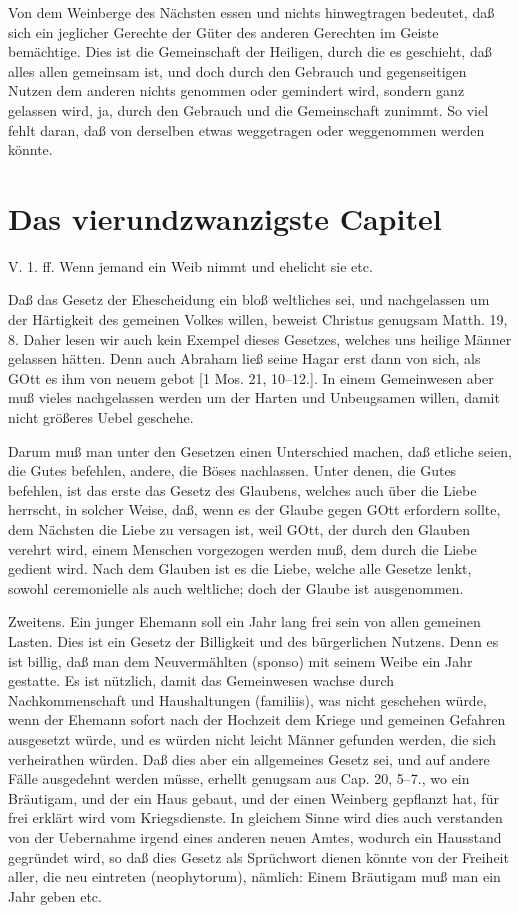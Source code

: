 Von dem Weinberge des Nächsten essen und nichts hinwegtragen bedeutet, daß sich ein jeglicher Gerechte der Güter des anderen Gerechten im Geiste bemächtige. Dies ist die Gemeinschaft der Heiligen, durch die es geschieht, daß alles allen gemeinsam ist, und doch durch den Gebrauch und gegenseitigen Nutzen dem anderen nichts genommen oder gemindert wird, sondern ganz gelassen wird, ja, durch den Gebrauch und die Gemeinschaft zunimmt. So viel fehlt daran, daß von derselben etwas weggetragen oder weggenommen werden könnte.

\section{Das vierundzwanzigste Capitel}

\begin{schriftzitat}
V. 1. ff. Wenn jemand ein Weib nimmt und ehelicht sie etc.
\end{schriftzitat}

Daß das Gesetz der Ehescheidung ein bloß weltliches sei, und nachgelassen um der Härtigkeit des gemeinen Volkes willen, beweist Christus genugsam Matth. 19, 8. Daher lesen wir auch kein Exempel dieses Gesetzes, welches uns heilige Männer gelassen hätten. Denn auch Abraham ließ seine Hagar erst dann von sich, als GOtt es ihm von neuem gebot [1 Mos. 21, 10–12.]. In einem Gemeinwesen aber muß vieles nachgelassen werden um der Harten und Unbeugsamen willen, damit nicht größeres Uebel geschehe.

Darum muß man unter den Gesetzen einen Unterschied machen, daß etliche seien, die Gutes befehlen, andere, die Böses nachlassen. Unter denen, die Gutes befehlen, ist das erste das Gesetz des Glaubens, welches auch über die Liebe herrscht, in solcher Weise, daß, wenn es der Glaube gegen GOtt erfordern sollte, dem Nächsten die Liebe zu versagen ist, weil GOtt, der durch den Glauben verehrt wird, einem Menschen vorgezogen werden muß, dem durch die Liebe gedient wird. Nach dem Glauben ist es die Liebe, welche alle Gesetze lenkt, sowohl ceremonielle als auch weltliche; doch der Glaube ist ausgenommen.

Zweitens. Ein junger Ehemann soll ein Jahr lang frei sein von allen gemeinen Lasten. Dies ist ein Gesetz der Billigkeit und des bürgerlichen Nutzens. Denn es ist billig, daß man dem Neuvermählten (sponso) mit seinem Weibe ein Jahr gestatte. Es ist nützlich, damit das Gemeinwesen wachse durch Nachkommenschaft und Haushaltungen (familiis), was nicht geschehen würde, wenn der Ehemann sofort nach der Hochzeit dem Kriege und gemeinen Gefahren ausgesetzt würde, und es würden nicht leicht Männer gefunden werden, die sich verheirathen würden. Daß dies aber ein allgemeines Gesetz sei, und auf andere Fälle ausgedehnt werden müsse, erhellt genugsam aus Cap. 20, 5–7., wo ein Bräutigam, und der ein Haus gebaut, und der einen Weinberg gepflanzt hat, für frei erklärt wird vom Kriegsdienste. In gleichem Sinne wird dies auch verstanden von der Uebernahme irgend eines anderen neuen Amtes, wodurch ein Hausstand gegründet wird, so daß dies Gesetz als Sprüchwort dienen könnte von der Freiheit aller, die neu eintreten (neophytorum), nämlich: Einem Bräutigam muß man ein Jahr geben etc.

